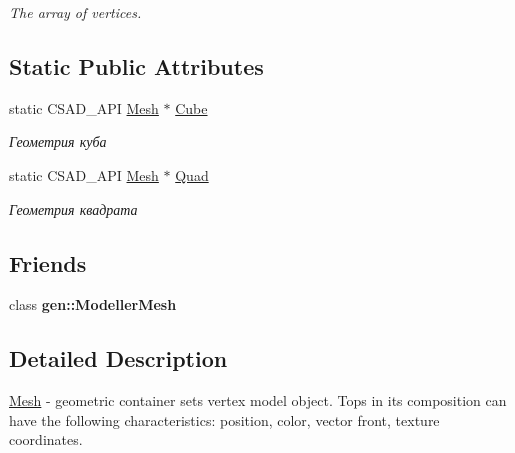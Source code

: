 \begin{DoxyCompactItemize}
\begin{DoxyCompactList}\small\item\em The array of vertices. \end{DoxyCompactList}\end{DoxyCompactItemize}
\subsection*{Static Public Attributes}
\begin{DoxyCompactItemize}
\item 
\hypertarget{classcsad_1_1_mesh_a4182d08a8d02d924319ab10c3e3c850d}{static C\-S\-A\-D\-\_\-\-A\-P\-I \hyperlink{classcsad_1_1_mesh}{Mesh} $\ast$ \hyperlink{classcsad_1_1_mesh_a4182d08a8d02d924319ab10c3e3c850d}{Cube}}\label{classcsad_1_1_mesh_a4182d08a8d02d924319ab10c3e3c850d}

\begin{DoxyCompactList}\small\item\em Геометрия куба \end{DoxyCompactList}\item 
\hypertarget{classcsad_1_1_mesh_a6f4b2f018b6ac1ad03f75f0cd7e7398e}{static C\-S\-A\-D\-\_\-\-A\-P\-I \hyperlink{classcsad_1_1_mesh}{Mesh} $\ast$ \hyperlink{classcsad_1_1_mesh_a6f4b2f018b6ac1ad03f75f0cd7e7398e}{Quad}}\label{classcsad_1_1_mesh_a6f4b2f018b6ac1ad03f75f0cd7e7398e}

\begin{DoxyCompactList}\small\item\em Геометрия квадрата \end{DoxyCompactList}\end{DoxyCompactItemize}
\subsection*{Friends}
\begin{DoxyCompactItemize}
\item 
\hypertarget{classcsad_1_1_mesh_a7a0fd97956d115f48a68405a7feed6db}{class {\bfseries gen\-::\-Modeller\-Mesh}}\label{classcsad_1_1_mesh_a7a0fd97956d115f48a68405a7feed6db}

\end{DoxyCompactItemize}


\subsection{Detailed Description}
\hyperlink{classcsad_1_1_mesh}{Mesh} -\/ geometric container sets vertex model object. Tops in its composition can have the following characteristics\-: position, color, vector front, texture coordinates. 


